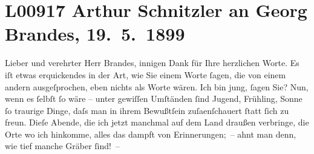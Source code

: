 

\section[Arthur Schnitzler an Georg Brandes, 19. 5. 1899]{L00917 Arthur Schnitzler an Georg Brandes, 19. 5. 1899}
\nopagebreak{}
\rehead{ }\normalsize\beginnumbering{}
\toendnotes[C]{\smallbreak\pagebreak[2]}
\toendnotes[C]{\smallbreak}
\pstart{}{\pb}Lieber und verehrter Herr Brandes,\pend\vspace{0.5em}
\pstart
           innigen Dank für Ihre herzlichen Worte. Es iſt etwas erquickendes in der Art, wie Sie
               einem Worte ſagen, die von einem andern ausgeſprochen, eben nichts als Worte wären.
               Ich bin jung, ſagen Sie? Nun, wenn es ſelbſt ſo wäre – unter gewiſſen Umſtänden ſind
               Jugend, Frühling, Sonne ſo traurige Dinge, daſs man in ihrem Bewußtſein zuſa{\geminationm}enſchauert ſtatt ſich zu {\pb}freun. Dieſe Abende, die ich jetzt manchmal auf
               dem Land draußen verbringe, die Orte wo ich hinkomme, alles das dampft von
               Erinnerungen; – ahnt man denn, wie tief manche Gräber ſind! –\pend
           
